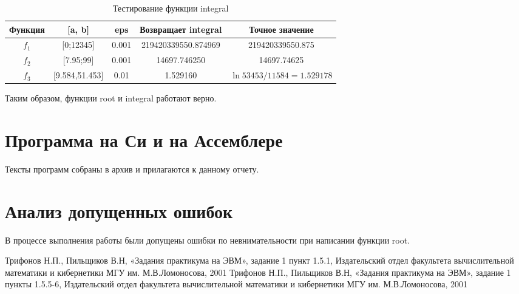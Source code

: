 \documentclass[a4paper,12pt,titlepage,finall]{article}
\begin{document}
\begin{table}[h]
\centering
\begin{tabular}{|c|c|c|c|c|}
\hline
Функция & [a, b] &eps& Возвращает integral & Точное значение \\
\hline
$f_1 $ & [0;12345] &0.001 & 219420339550.874969 & 219420339550.875 \\
$f_2 $ & [7.95;99] &0.001 & 14697.746250 & 14697.74625 \\
$f_3 $ & [9.584,51.453] &0.01 & 1.529160 & $\ln{53453/11584} = 1.529178$ \\

\hline
\end{tabular}
\caption{Тестирование функции integral}
\label{table3}
\end{table}


\vspace{\baselineskip}

Таким образом, функции root и integral работают верно.

\newpage

\section{Программа на Си и на Ассемблере}

Тексты программ собраны в архив и прилагаются к данному отчету.

\newpage

\section{Анализ допущенных ошибок}

В процессе выполнения работы были допущены ошибки по невнимательности при написании функции root. 

\newpage


\begin{raggedright}
\begin{thebibliography}{99}
 Трифонов Н.П., Пильщиков В.Н, «Задания практикума на ЭВМ», задание 1 пункт 1.5.1, Издательский отдел факультета вычислительной математики и кибернетики МГУ им. М.В.Ломоносова, 2001 
 Трифонов Н.П., Пильщиков В.Н, «Задания практикума на ЭВМ», задание 1 пункты 1.5.5-6, Издательский отдел факультета вычислительной математики и кибернетики МГУ им. М.В.Ломоносова, 2001 
\end{thebibliography}
\end{raggedright}
\end{document}
